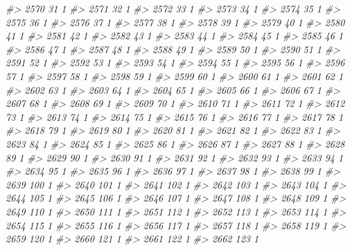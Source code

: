 \documentclass[]{article}
\newenvironment{Shaded}{\begin{snugshade}}{\end{snugshade}}
\newcommand{\CommentTok}[1]{\textcolor[rgb]{0.56,0.35,0.01}{\textit{#1}}}
\begin{document}
\begin{Shaded}
\begin{Highlighting}[]
\CommentTok{#> 2570  31  1}
\CommentTok{#> 2571  32  1}
\CommentTok{#> 2572  33  1}
\CommentTok{#> 2573  34  1}
\CommentTok{#> 2574  35  1}
\CommentTok{#> 2575  36  1}
\CommentTok{#> 2576  37  1}
\CommentTok{#> 2577  38  1}
\CommentTok{#> 2578  39  1}
\CommentTok{#> 2579  40  1}
\CommentTok{#> 2580  41  1}
\CommentTok{#> 2581  42  1}
\CommentTok{#> 2582  43  1}
\CommentTok{#> 2583  44  1}
\CommentTok{#> 2584  45  1}
\CommentTok{#> 2585  46  1}
\CommentTok{#> 2586  47  1}
\CommentTok{#> 2587  48  1}
\CommentTok{#> 2588  49  1}
\CommentTok{#> 2589  50  1}
\CommentTok{#> 2590  51  1}
\CommentTok{#> 2591  52  1}
\CommentTok{#> 2592  53  1}
\CommentTok{#> 2593  54  1}
\CommentTok{#> 2594  55  1}
\CommentTok{#> 2595  56  1}
\CommentTok{#> 2596  57  1}
\CommentTok{#> 2597  58  1}
\CommentTok{#> 2598  59  1}
\CommentTok{#> 2599  60  1}
\CommentTok{#> 2600  61  1}
\CommentTok{#> 2601  62  1}
\CommentTok{#> 2602  63  1}
\CommentTok{#> 2603  64  1}
\CommentTok{#> 2604  65  1}
\CommentTok{#> 2605  66  1}
\CommentTok{#> 2606  67  1}
\CommentTok{#> 2607  68  1}
\CommentTok{#> 2608  69  1}
\CommentTok{#> 2609  70  1}
\CommentTok{#> 2610  71  1}
\CommentTok{#> 2611  72  1}
\CommentTok{#> 2612  73  1}
\CommentTok{#> 2613  74  1}
\CommentTok{#> 2614  75  1}
\CommentTok{#> 2615  76  1}
\CommentTok{#> 2616  77  1}
\CommentTok{#> 2617  78  1}
\CommentTok{#> 2618  79  1}
\CommentTok{#> 2619  80  1}
\CommentTok{#> 2620  81  1}
\CommentTok{#> 2621  82  1}
\CommentTok{#> 2622  83  1}
\CommentTok{#> 2623  84  1}
\CommentTok{#> 2624  85  1}
\CommentTok{#> 2625  86  1}
\CommentTok{#> 2626  87  1}
\CommentTok{#> 2627  88  1}
\CommentTok{#> 2628  89  1}
\CommentTok{#> 2629  90  1}
\CommentTok{#> 2630  91  1}
\CommentTok{#> 2631  92  1}
\CommentTok{#> 2632  93  1}
\CommentTok{#> 2633  94  1}
\CommentTok{#> 2634  95  1}
\CommentTok{#> 2635  96  1}
\CommentTok{#> 2636  97  1}
\CommentTok{#> 2637  98  1}
\CommentTok{#> 2638  99  1}
\CommentTok{#> 2639 100  1}
\CommentTok{#> 2640 101  1}
\CommentTok{#> 2641 102  1}
\CommentTok{#> 2642 103  1}
\CommentTok{#> 2643 104  1}
\CommentTok{#> 2644 105  1}
\CommentTok{#> 2645 106  1}
\CommentTok{#> 2646 107  1}
\CommentTok{#> 2647 108  1}
\CommentTok{#> 2648 109  1}
\CommentTok{#> 2649 110  1}
\CommentTok{#> 2650 111  1}
\CommentTok{#> 2651 112  1}
\CommentTok{#> 2652 113  1}
\CommentTok{#> 2653 114  1}
\CommentTok{#> 2654 115  1}
\CommentTok{#> 2655 116  1}
\CommentTok{#> 2656 117  1}
\CommentTok{#> 2657 118  1}
\CommentTok{#> 2658 119  1}
\CommentTok{#> 2659 120  1}
\CommentTok{#> 2660 121  1}
\CommentTok{#> 2661 122  1}
\CommentTok{#> 2662 123  1}

\end{Highlighting}
\end{Shaded}
\end{document}
